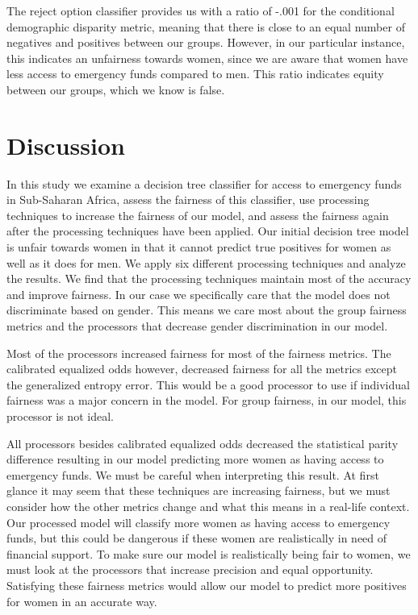 \documentclass[water,article,submit,moreauthors,pdftex]{mdpi}
\begin{document}
The reject option classifier provides us with a ratio of -.001 for the
conditional demographic disparity metric, meaning that there is close to
an equal number of negatives and positives between our groups. However,
in our particular instance, this indicates an unfairness towards women,
since we are aware that women have less access to emergency funds
compared to men. This ratio indicates equity between our groups, which
we know is false.

\hypertarget{discussion}{%
\section{Discussion}\label{discussion}}

In this study we examine a decision tree classifier for access to
emergency funds in Sub-Saharan Africa, assess the fairness of this
classifier, use processing techniques to increase the fairness of our
model, and assess the fairness again after the processing techniques
have been applied. Our initial decision tree model is unfair towards
women in that it cannot predict true positives for women as well as it
does for men. We apply six different processing techniques and analyze
the results. We find that the processing techniques maintain most of the
accuracy and improve fairness. In our case we specifically care that the
model does not discriminate based on gender. This means we care most
about the group fairness metrics and the processors that decrease gender
discrimination in our model.

Most of the processors increased fairness for most of the fairness
metrics. The calibrated equalized odds however, decreased fairness for
all the metrics except the generalized entropy error. This would be a
good processor to use if individual fairness was a major concern in the
model. For group fairness, in our model, this processor is not ideal.

All processors besides calibrated equalized odds decreased the
statistical parity difference resulting in our model predicting more
women as having access to emergency funds. We must be careful when
interpreting this result. At first glance it may seem that these
techniques are increasing fairness, but we must consider how the other
metrics change and what this means in a real-life context. Our processed
model will classify more women as having access to emergency funds, but
this could be dangerous if these women are realistically in need of
financial support. To make sure our model is realistically being fair to
women, we must look at the processors that increase precision and equal
opportunity. Satisfying these fairness metrics would allow our model to
predict more positives for women in an accurate way.
\end{document}
